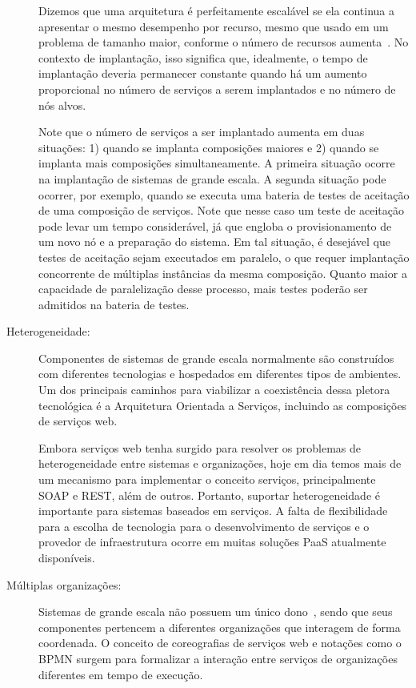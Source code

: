 \begin{description}
Dizemos que uma arquitetura é perfeitamente escalável
se ela continua a apresentar o mesmo desempenho por recurso,
mesmo que usado em um problema de tamanho maior, conforme o número
de recursos aumenta~\cite{Quinn1994Scalability}.
No contexto de implantação, isso significa que, idealmente,
o tempo de implantação deveria permanecer constante quando há um
aumento proporcional no número de serviços a serem implantados e
no número de nós alvos.

Note que o número de serviços a ser implantado aumenta em duas situações:
1) quando se implanta composições maiores e 2) quando se implanta
mais composições simultaneamente. 
A primeira situação ocorre na implantação de sistemas de grande escala.
A segunda situação pode ocorrer, por exemplo,
quando se executa uma bateria de testes de aceitação de uma composição de serviços.
Note que nesse caso um teste de aceitação pode levar um tempo considerável,
já que engloba o provisionamento de um novo nó e a preparação do sistema.
Em tal situação, é desejável que testes de aceitação sejam executados em paralelo,
o que requer implantação concorrente de múltiplas instâncias da mesma composição.
Quanto maior a capacidade de paralelização desse processo,
mais testes poderão ser admitidos na bateria de testes.

\item [Heterogeneidade:]

Componentes de sistemas de grande escala normalmente são construídos com diferentes tecnologias
e hospedados em diferentes tipos de ambientes.
Um dos principais caminhos para viabilizar a coexistência dessa pletora tecnológica
é a Arquitetura Orientada a Serviços, incluindo as composições de serviços web.

Embora serviços web tenha surgido para resolver os problemas de heterogeneidade
entre sistemas e organizações, hoje em dia temos mais de um mecanismo para
implementar o conceito serviços, principalmente SOAP e REST, além de outros.
Portanto, suportar heterogeneidade é importante para sistemas baseados em serviços.
A falta de flexibilidade para a escolha de tecnologia para o desenvolvimento de serviços
e o provedor de infraestrutura ocorre em muitas soluções PaaS atualmente disponíveis.

\item [Múltiplas organizações:]

Sistemas de grande escala não possuem um único dono~\cite{Steen2011VeryLarge}, 
sendo que seus componentes pertencem a diferentes organizações que interagem de forma coordenada. 
O conceito de coreografias de serviços web e notações como o BPMN surgem para 
formalizar a interação entre serviços de organizações diferentes em tempo de execução.


\end{description}
